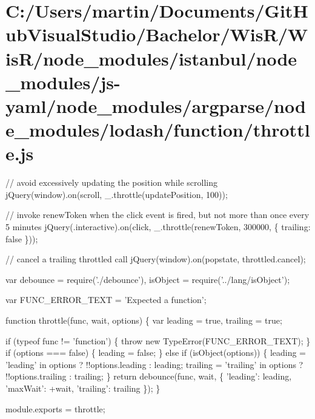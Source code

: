 \hypertarget{_c_1_2_users_2martin_2_documents_2_git_hub_visual_studio_2_bachelor_2_wis_r_2_wis_r_2node_moduleba657e74721a50cbe04c4f4ad3428f16}{}\section{C\+:/\+Users/martin/\+Documents/\+Git\+Hub\+Visual\+Studio/\+Bachelor/\+Wis\+R/\+Wis\+R/node\+\_\+modules/istanbul/node\+\_\+modules/js-\/yaml/node\+\_\+modules/argparse/node\+\_\+modules/lodash/function/throttle.\+js}
// avoid excessively updating the position while scrolling j\+Query(window).on(\textquotesingle{}scroll\textquotesingle{}, \+\_\+.\+throttle(update\+Position, 100));

// invoke {\ttfamily renew\+Token} when the click event is fired, but not more than once every 5 minutes j\+Query(\textquotesingle{}.interactive\textquotesingle{}).on(\textquotesingle{}click\textquotesingle{}, \+\_\+.\+throttle(renew\+Token, 300000, \{ \textquotesingle{}trailing\textquotesingle{}\+: false \}));

// cancel a trailing throttled call j\+Query(window).on(\textquotesingle{}popstate\textquotesingle{}, throttled.\+cancel);


\begin{DoxyCodeInclude}
var debounce = require(\textcolor{stringliteral}{'./debounce'}),
    isObject = require(\textcolor{stringliteral}{'../lang/isObject'});

var FUNC\_ERROR\_TEXT = \textcolor{stringliteral}{'Expected a function'};

\textcolor{keyword}{function} throttle(func, wait, options) \{
  var leading = \textcolor{keyword}{true},
      trailing = \textcolor{keyword}{true};

  \textcolor{keywordflow}{if} (typeof func != \textcolor{stringliteral}{'function'}) \{
    \textcolor{keywordflow}{throw} \textcolor{keyword}{new} TypeError(FUNC\_ERROR\_TEXT);
  \}
  \textcolor{keywordflow}{if} (options === \textcolor{keyword}{false}) \{
    leading = \textcolor{keyword}{false};
  \} \textcolor{keywordflow}{else} \textcolor{keywordflow}{if} (isObject(options)) \{
    leading = \textcolor{stringliteral}{'leading'} in options ? !!options.leading : leading;
    trailing = \textcolor{stringliteral}{'trailing'} in options ? !!options.trailing : trailing;
  \}
  \textcolor{keywordflow}{return} debounce(func, wait, \{ \textcolor{stringliteral}{'leading'}: leading, \textcolor{stringliteral}{'maxWait'}: +wait, \textcolor{stringliteral}{'trailing'}: trailing \});
\}

module.exports = throttle;
\end{DoxyCodeInclude}
 